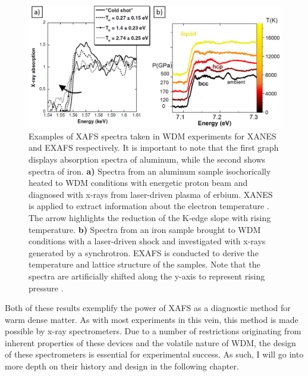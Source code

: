 \begin{figure} [H]
	\centering
	\includegraphics[width = \textwidth]{Diagrams/XAFS_examples.PNG}
	\caption{Examples of XAFS spectra taken in WDM experiments for XANES and 
	EXAFS respectively. It is important to note that the first graph displays 
	absorption spectra of aluminum, while the second shows spectra of iron. 
	\textbf{a)} Spectra from an aluminum sample isochorically heated to WDM 
	conditions with energetic proton beam and diagnosed with x-rays from 
	laser-driven plasma of erbium. XANES is applied to extract information 
	about the electron temperature \citep{levy2009x}. 
	The arrow highlights the reduction of the K-edge slope with rising 
	temperature.
	\textbf{b)} Spectra from an iron sample brought to WDM conditions with a 
	laser-driven shock and investigated with x-rays generated by a synchrotron. 
	EXAFS is conducted to derive the temperature and lattice structure of the 
	samples. Note that the spectra are artificially shifted along the y-axis to 
	represent rising pressure \citep{torchio2016probing}.}
	\label{XAFS_examples}
\end{figure}

Both of these results exemplify the power of XAFS as a diagnostic method for 
warm dense matter. As with most experiments in this vein, this method is made 
possible by x-ray spectrometers. Due to a number of restrictions originating 
from inherent properties of these devices and the volatile nature of WDM, the design of these spectrometers is essential for experimental success. As such, I will 
go into more depth on their history and design in the following chapter. 